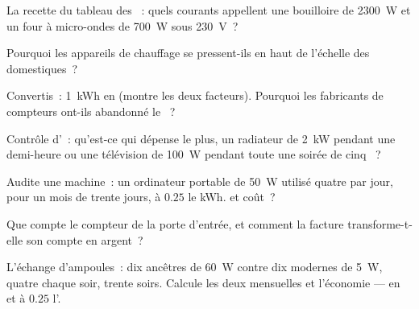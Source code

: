 \begin{exercise}[$\star$]\label{exo:g9:electric-power-energy:3}
La recette du tableau des ~: quels courants appellent une
bouilloire de \qty{2300}{W} et un four à micro-ondes de \qty{700}{W}
sous \qty{230}{V}~?
\end{exercise}

\begin{exercise}[$\star$]\label{exo:g9:electric-power-energy:4}
Pourquoi les appareils de chauffage se pressent-ils en haut de
l'échelle des  domestiques~?
\end{exercise}

\begin{exercise}[$\star$]\label{exo:g9:electric-power-energy:5}
Convertis~: \qty{1}{kWh} en  (montre les deux facteurs).
Pourquoi les fabricants de compteurs ont-ils abandonné le ~?
\end{exercise}

\begin{exercise}[$\star$]\label{exo:g9:electric-power-energy:6}
Contrôle d'~: qu'est-ce qui dépense le plus, un radiateur de
\qty{2}{kW} pendant une demi-heure ou une télévision de \qty{100}{W}
pendant toute une soirée de cinq ~?
\end{exercise}

\begin{exercise}[$\star$]\label{exo:g9:electric-power-energy:7}
Audite une machine~: un ordinateur portable de \qty{50}{W} utilisé
quatre  par jour, pour un mois de trente jours, à $0.25$ le
\unit{kWh}.  et coût~?
\end{exercise}

\begin{exercise}[$\star$]\label{exo:g9:electric-power-energy:8}
Que compte le compteur de la porte d'entrée, et comment la facture
transforme-t-elle son compte en argent~?
\end{exercise}

\begin{exercise}[$\star\star$]\label{exo:g9:electric-power-energy:9}
L'échange d'ampoules~: dix ancêtres de \qty{60}{W} contre dix modernes
de \qty{5}{W}, quatre  chaque soir, trente soirs. Calcule les
deux  mensuelles et l'économie --- en  et à
$0.25$ l'.
\end{exercise}

